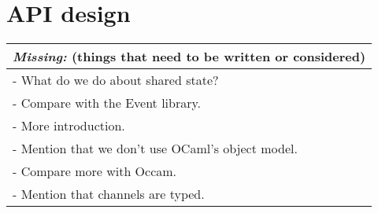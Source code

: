 \documentclass[a4paper,12pt]{article}
\newcommand{\missing}[1]{
  \begin{tabular}{|p{11cm}|}
    \hline
    \emph{Missing:} {\scriptsize (things that need to be written or considered)} \\
    \hline
    #1
    \hline
  \end{tabular}
}
\begin{document}
%
%
%
%

\section{API design}
\label{analysis}
\missing{
- What do we do about shared state?\\
- Compare with the Event library.\\
- More introduction.\\
- Mention that we don't use OCaml's object model.\\
- Compare more with Occam.\\
- Mention that channels are typed.\\
}
\end{document}
